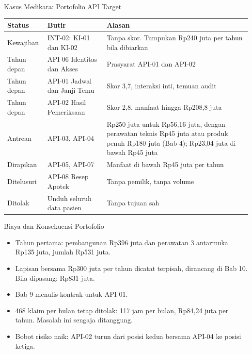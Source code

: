 \documentclass[aspectratio=169, table, 12pt]{beamer}
\begin{document}
\begin{frame}{{\Large Kasus Medikara: Portofolio API Target}}
  \scriptsize
  \begin{tabularx}{\textwidth}{>{\raggedright\arraybackslash}p{1.7cm} >{\raggedright\arraybackslash}p{4.0cm}
      >{\raggedright\arraybackslash}X}
    \hline
    \textbf{Status} & \textbf{Butir} & \textbf{Alasan} \\ \hline
    Kewajiban & INT-02: KI-01 dan KI-02 & Tanpa skor. Tumpukan Rp240 juta per tahun bila dibiarkan \\ \hline
    Tahun depan & API-06 Identitas dan Akses & Prasyarat API-01 dan API-02 \\ \hline
    Tahun depan & API-01 Jadwal dan Janji Temu & Skor 3,7, interaksi inti, temuan audit \\ \hline
    Tahun depan & API-02 Hasil Pemeriksaan & Skor 2,8, manfaat hingga Rp208,8 juta \\ \hline
    Antrean & API-03, API-04 & Rp250 juta untuk Rp56,16 juta, dengan perawatan teknis Rp45 juta atau produk penuh Rp180 juta (Bab 4); Rp23,04 juta di bawah Rp45 juta \\ \hline
    Dirapikan & API-05, API-07 & Manfaat di bawah Rp45 juta per tahun \\ \hline
    Ditelusuri & API-08 Resep Apotek & Tanpa pemilik, tanpa volume \\ \hline
    Ditolak & Unduh seluruh data pasien & Tanpa tujuan sah \\ \hline
  \end{tabularx}
\end{frame}

\begin{frame}{{\Large Biaya dan Konsekuensi Portofolio}}
  \vspace{8pt}
  \begin{itemize}
    \item Tahun pertama: pembangunan Rp396 juta dan perawatan 3 antarmuka Rp135 juta, jumlah Rp531 juta.
    \item Lapisan bersama Rp300 juta per tahun dicatat terpisah, dirancang di Bab 10. Bila dipasang: Rp831 juta.
    \item Bab 9 menulis kontrak untuk API-01.
    \item 468 klaim per bulan tetap ditolak: 117 jam per bulan, Rp84,24 juta per tahun. Masalah ini sengaja ditanggung.
    \item Bobot risiko naik: API-02 turun dari posisi kedua bersama API-04 ke posisi ketiga.
  \end{itemize}
\end{frame}
\end{document}
